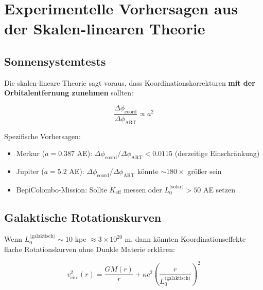 \documentclass[11pt,a4paper]{article}
\begin{document}
	
	\section{Experimentelle Vorhersagen aus der Skalen-linearen Theorie}
	\label{sec:scale-predictions}
	
	\subsection{Sonnensystemtests}
	
	Die skalen-lineare Theorie sagt voraus, dass Koordinationskorrekturen \textbf{mit der Orbitalentfernung zunehmen} sollten:
	
	\begin{equation}
		\frac{\Delta\phi_{\text{coord}}}{\Delta\phi_{\text{ART}}} \propto a^2
	\end{equation}
	
	Spezifische Vorhersagen:
	\begin{itemize}
		\item Merkur ($a = 0.387$ AE): $\Delta\phi_{\text{coord}}/\Delta\phi_{\text{ART}} < 0.0115$ (derzeitige Einschränkung)
		\item Jupiter ($a = 5.2$ AE): $\Delta\phi_{\text{coord}}/\Delta\phi_{\text{ART}}$ könnte $\sim 180\times$ größer sein
		\item BepiColombo-Mission: Sollte $K_{\mathrm{eff}}$ messen oder $L_0^{\text{(solar)}} > 50$ AE setzen
	\end{itemize}
	
	\subsection{Galaktische Rotationskurven}
	
	Wenn $L_0^{\text{(galaktisch)}} \sim 10$ kpc $\approx 3\times10^{20}$ m, dann könnten Koordinationseffekte flache Rotationskurven ohne Dunkle Materie erklären:
	
	\begin{equation}
		v_{\text{circ}}^2(r) = \frac{GM(r)}{r} + \kappa c^2 \left(\frac{r}{L_0^{\text{(galaktisch)}}}\right)^2
	\end{equation}
	
\end{document}

